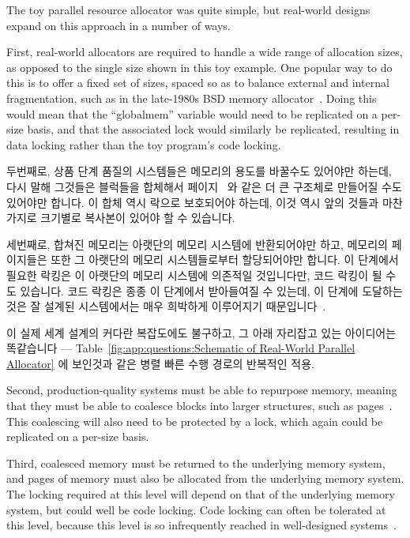 The toy parallel resource allocator was quite simple, but real-world
designs expand on this approach in a number of ways.

First, real-world allocators are required to handle a wide range
of allocation sizes, as opposed to the single size shown in this
toy example.
One popular way to do this is to offer a fixed set of sizes, spaced
so as to balance external and internal fragmentation, such as in
the late-1980s BSD memory allocator~\cite{McKusick88}.
Doing this would mean that the ``globalmem'' variable would need
to be replicated on a per-size basis, and that the associated
lock would similarly be replicated, resulting in data locking
rather than the toy program's code locking.
\fi

두번째로, 상품 단계 품질의 시스템들은 메모리의 용도를 바꿀수도 있어야만 하는데,
다시 말해 그것들은 블럭들을 합체해서 페이지~\cite{McKenney93} 와 같은 더 큰
구조체로 만들어질 수도 있어야만 합니다.
이 합체 역시 락으로 보호되어야 하는데, 이것 역시 앞의 것들과 마찬가지로
크기별로 복사본이 있어야 할 수 있습니다.

세번째로, 합쳐진 메모리는 아랫단의 메모리 시스템에 반환되어야만 하고, 메모리의
페이지들은 또한 그 아랫단의 메모리 시스템들로부터 할당되어야만 합니다.
이 단계에서 필요한 락킹은 이 아랫단의 메모리 시스템에 의존적일 것입니다만, 코드
락킹이 될 수도 있습니다.
코드 락킹은 종종 이 단계에서 받아들여질 수 있는데, 이 단계에 도달하는 것은 잘
설계된 시스템에서는 매우 희박하게 이루어지기 때문입니다~\cite{McKenney01e}.

이 실제 세계 설계의 커다란 복잡도에도 불구하고, 그 아래 자리잡고 있는
아이디어는 똑같습니다 --- Table~\ref{fig:app:questions:Schematic of Real-World
Parallel Allocator} 에 보인것과 같은 병렬 빠른 수행 경로의 반복적인 적용.
\iffalse

Second, production-quality systems must be able to repurpose memory,
meaning that they must be able to coalesce blocks into larger structures,
such as pages~\cite{McKenney93}.
This coalescing will also need to be protected by a lock, which again
could be replicated on a per-size basis.

Third, coalesced memory must be returned to the underlying memory
system, and pages of memory must also be allocated from the underlying
memory system.
The locking required at this level will depend on that of the underlying
memory system, but could well be code locking.
Code locking can often be tolerated at this level, because this
level is so infrequently reached in well-designed systems~\cite{McKenney01e}.

